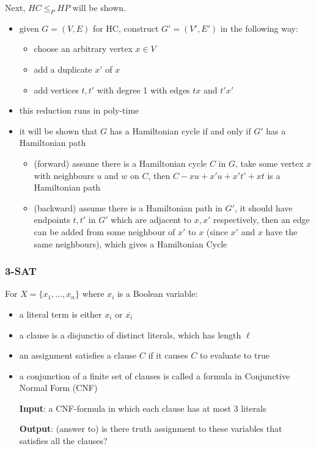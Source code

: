 \documentclass[11pt]{article}
\begin{document}
Next, \(HC \le_{P} HP\) will be shown.
\begin{itemize}
\item given \(G = (V,E)\) for HC, construct \(G' = (V', E')\) in the following way:
\begin{itemize}
\item choose an arbitrary vertex \(x \in V\)
\item add a duplicate \(x'\) of \(x\)
\item add vertices \(t,t'\) with degree 1 with edges \(tx\) and \(t'x'\)
\end{itemize}
\item this reduction runs in poly-time
\item it will be shown that \(G\) has a Hamiltonian cycle if and only if \(G'\)
has a Hamiltonian path
\begin{itemize}
\item (forward) assume there is a Hamiltonian cycle \(C\) in \(G\), take some vertex \(x\)
with neighbours \(u\) and \(w\) on \(C\), then \(C - xu + x'u + x't' + xt\) is a
Hamiltonian path
\item (backward) assume there is a Hamiltonian path in \(G'\), it should have
endpoints \(t, t'\) in \(G'\) which are adjacent to \(x, x'\) respectively, then an
edge can be added from some neighbour of \(x'\) to \(x\) (since \(x'\) and \(x\)
have the same neighbours), which gives a Hamiltonian Cycle
\end{itemize}
\end{itemize}
\subsubsection{3-SAT}
\label{sec:org8715678}
For \(X = \{x_{1}, \dots, x_{n}\}\) where \(x_{i}\) is a Boolean variable:
\begin{itemize}
\item a literal term is either \(x_{i}\) or \(\overline{x_{i}}\)
\item a clause is a disjunctio of distinct literals, which has length \(\ell\)
\item an assignment satisfies a clause \(C\) if it causes \(C\) to evaluate to true
\item a conjunction of a finite set of clauses is called a formula in
Conjunctive Normal Form (CNF)

\textbf{Input}: a CNF-formula in which each clause has at most 3 literals

\textbf{Output}: (answer to) is there truth assignment to these variables that
satisfies all the clauses?
\end{itemize}
\end{document}
